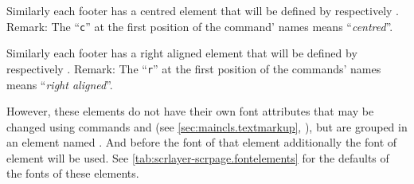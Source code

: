 Similarly each footer has a centred element that will be defined by
 respectively . Remark: The ``\texttt{c}'' at the
first position of the command' names means ``\emph{centred}''.

Similarly each footer has a right aligned element that will be defined by
 respectively . Remark: The ``\texttt{r}'' at the
first position of the commands' names means ``\emph{right aligned}''.

%
%
However, these elements do not have their own font attributes that may be
changed using commands  and  (see
\autoref{sec:maincls.textmarkup}, ),
but are grouped in an element named . And before the
font of that element additionally the font of element
 will be used. See
\autoref{tab:scrlayer-scrpage.fontelements} for the defaults of the fonts of
these elements.%
%
%

